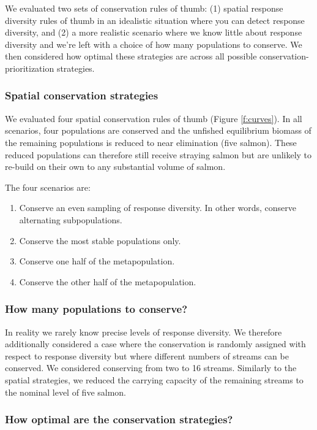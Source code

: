 We evaluated two sets of conservation rules of thumb: (1) spatial
response diversity rules of thumb in an idealistic situation where you
can detect response diversity, and (2) a more realistic scenario where
we know little about response diversity and we're left with a choice of
how many populations to conserve. We then considered how optimal these
strategies are across all possible conservation-prioritization
strategies.

\subsubsection{Spatial conservation strategies}

We evaluated four spatial conservation rules of thumb (Figure
\ref{f:curves}). In all scenarios, four populations are conserved and
the unfished equilibrium biomass of the remaining populations is reduced
to near elimination (five salmon). These reduced populations can
therefore still receive straying salmon but are unlikely to re-build on
their own to any substantial volume of salmon.

The four scenarios are:

\begin{enumerate}
\def\labelenumi{\arabic{enumi}.}
\item
  Conserve an even sampling of response diversity. In other words,
  conserve alternating subpopulations.
\item
  Conserve the most stable populations only.
\item
  Conserve one half of the metapopulation.
\item
  Conserve the other half of the metapopulation.
\end{enumerate}

\subsubsection{How many populations to conserve?}

In reality we rarely know precise levels of response diversity. We
therefore additionally considered a case where the conservation is
randomly assigned with respect to response diversity but where different
numbers of streams can be conserved. We considered conserving from two
to 16 streams. Similarly to the spatial strategies, we reduced the
carrying capacity of the remaining streams to the nominal level of five
salmon.

\subsubsection{How optimal are the conservation strategies?}

